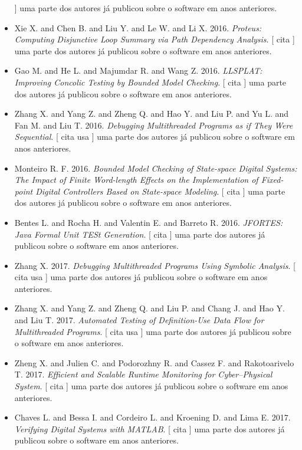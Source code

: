 \begin{itemize}
      ]
uma parte dos autores já publicou sobre o software em anos anteriores.
\item Xie X. and Chen B. and Liu Y. and Le W. and Li X.
      2016.
        \textit{ Proteus: Computing Disjunctive Loop Summary via Path Dependency Analysis}.
      [
          cita
      ]
uma parte dos autores já publicou sobre o software em anos anteriores.
\item Gao M. and He L. and Majumdar R. and Wang Z.
      2016.
        \textit{ LLSPLAT: Improving Concolic Testing by Bounded Model Checking}.
      [
          cita
      ]
uma parte dos autores já publicou sobre o software em anos anteriores.
\item Zhang X. and Yang Z. and Zheng Q. and Hao Y. and Liu P. and Yu L. and Fan M. and Liu T.
      2016.
        \textit{ Debugging Multithreaded Programs as if They Were Sequential}.
      [
          cita
          usa
      ]
uma parte dos autores já publicou sobre o software em anos anteriores.
\item Monteiro R. F.
      2016.
        \textit{ Bounded Model Checking of State-space Digital Systems: The Impact of Finite Word-length Effects on the Implementation of Fixed-point Digital Controllers Based on State-space Modeling}.
      [
          cita
      ]
uma parte dos autores já publicou sobre o software em anos anteriores.
\item Bentes L. and Rocha H. and Valentin E. and Barreto R.
      2016.
        \textit{ JFORTES: Java Formal Unit TESt Generation}.
      [
          cita
      ]
uma parte dos autores já publicou sobre o software em anos anteriores.
\item Zhang X.
      2017.
        \textit{ Debugging Multithreaded Programs Using Symbolic Analysis}.
      [
          cita
          usa
      ]
uma parte dos autores já publicou sobre o software em anos anteriores.
\item Zhang X. and Yang Z. and Zheng Q. and Liu P. and Chang J. and Hao Y. and Liu T.
      2017.
        \textit{ Automated Testing of Definition-Use Data Flow for Multithreaded Programs}.
      [
          cita
          usa
      ]
uma parte dos autores já publicou sobre o software em anos anteriores.
\item Zheng X. and Julien C. and Podorozhny R. and Cassez F. and Rakotoarivelo T.
      2017.
        \textit{ Efficient and Scalable Runtime Monitoring for Cyber--Physical System}.
      [
          cita
      ]
uma parte dos autores já publicou sobre o software em anos anteriores.
\item Chaves L. and Bessa I. and Cordeiro L. and Kroening D. and Lima E.
      2017.
        \textit{ Verifying Digital Systems with MATLAB}.
      [
          cita
      ]
uma parte dos autores já publicou sobre o software em anos anteriores.
\end{itemize}
